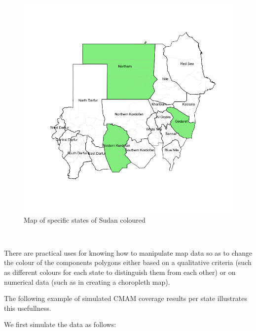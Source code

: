 \documentclass[12pt,a4paper,a4paper]{book}
\theoremstyle{definition}
\theoremstyle{definition}
\theoremstyle{definition}
\theoremstyle{remark}
\begin{document}
\begin{figure}[H]

{\centering \includegraphics{figures/map10-1} 

}

\caption{Map of specific states of Sudan coloured}\label{fig:map10}
\end{figure}

~

There are practical uses for knowing how to manipulate map data so as to
change the colour of the components polygons either based on a
qualitative criteria (such as different colours for each state to
distinguish them from each other) or on numerical data (such as in
creating a choropleth map).

The following example of simulated CMAM coverage results per state
illustrates this usefullness.

\newpage

We first simulate the data as follows:

~
\end{document}
